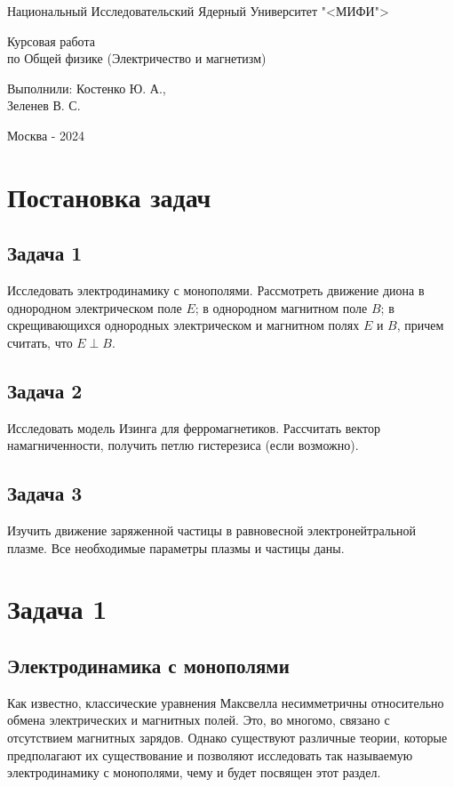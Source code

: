 \documentclass[oneside,final,14pt]{extarticle}
\begin{document}
	\begin{titlepage}
		\centerline{Национальный Исследовательский Ядерный Университет "<МИФИ">}
		\vfill
		\Large
		\begin{center}
			Курсовая работа\\ по Общей физике (Электричество и магнетизм)
		\end{center}
		\normalsize
		\vfill
		\begin{flushright}
			Выполнили: Костенко Ю. А., \\ Зеленев В. С.
		\end{flushright}
		\vfill \vfill \vfill
		\centerline{Москва - 2024}
	\end{titlepage}
	\setcounter{page}{2}
	\tableofcontents
	\newpage
	
	\section{Постановка задач}
	\subsection{Задача 1}
	Исследовать электродинамику с монополями. Рассмотреть движение диона в однородном электрическом поле $E$; в однородном магнитном поле $B$; в скрещивающихся однородных электрическом и магнитном полях $E$ и $B$, причем считать, что $E \perp B$.
	\subsection{Задача 2}
	Исследовать модель Изинга для ферромагнетиков. Рассчитать вектор намагниченности, получить петлю гистерезиса (если возможно). 
	\subsection{Задача 3}
	Изучить движение заряженной частицы в равновесной электронейтральной плазме. Все необходимые параметры плазмы и частицы даны. 
	\newpage
	
	\section{Задача 1}
	\subsection{Электродинамика с монополями}
	Как известно, классические уравнения Максвелла несимметричны относительно обмена электрических и магнитных полей. Это, во многомо, связано с отсутствием магнитных зарядов. Однако существуют различные теории, которые предполагают их существование и позволяют исследовать так называемую электродинамику с монополями, чему и будет посвящен этот раздел. 
	
\end{document}
